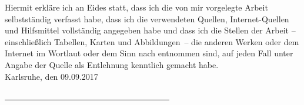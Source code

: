 \thispagestyle{empty}
\vspace*{13.5cm}
Hiermit erkläre ich an Eides statt, dass ich die von mir vorgelegte Arbeit
selbstständig verfasst habe, dass ich die verwendeten Quellen,
Internet-Quellen und Hilfsmittel vollständig angegeben habe und dass ich die
Stellen der Arbeit -- einschließlich Tabellen, Karten und Abbildungen~-- die
anderen Werken oder dem Internet im Wortlaut oder dem Sinn nach entnommen
sind, auf jeden Fall unter Angabe der Quelle als Entlehnung kenntlich gemacht
habe.\\

Karlsruhe, den 09.09.2017\\
\medskip
\medskip

\underline{~~~~~~~~~~~~~~~~~~~~~~~~~~~~~~~~~~~~~~~~}\\
\myname
